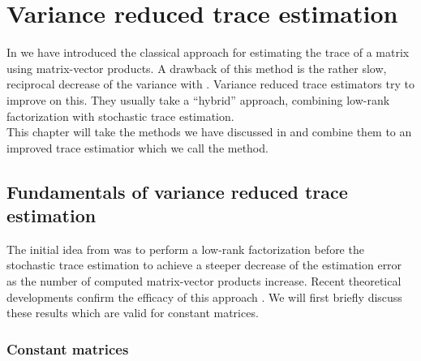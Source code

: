 \chapter{Variance reduced trace estimation}
\label{chp:4-nystromchebyshev}

In  we have introduced the
classical approach for estimating the trace of a matrix using matrix-vector
products. A drawback of this method is the rather slow, reciprocal decrease of
the variance with . Variance reduced trace estimators
try to improve on this. They usually take a \enquote{hybrid} approach, combining
low-rank factorization with stochastic trace estimation.\\

This chapter will take the methods we have discussed in 
and  combine them to an improved trace estimatior which
we call the  method.


\section{Fundamentals of variance reduced trace estimation}
\label{sec:4-nystromchebyshev-hybrid}

The initial idea from \cite{lin2017randomized} was to perform a low-rank
factorization before the stochastic trace estimation to achieve a
steeper decrease of the estimation error as the number of computed
matrix-vector products increase. Recent theoretical developments confirm the
efficacy of this approach \cite{meyer2021hutch,persson2022hutch}.
We will first briefly discuss these results which are valid 
for constant matrices.\\

\subsection{Constant matrices}
\label{subsec:4-nystromchebyshev-reduction-constant-matrices}

